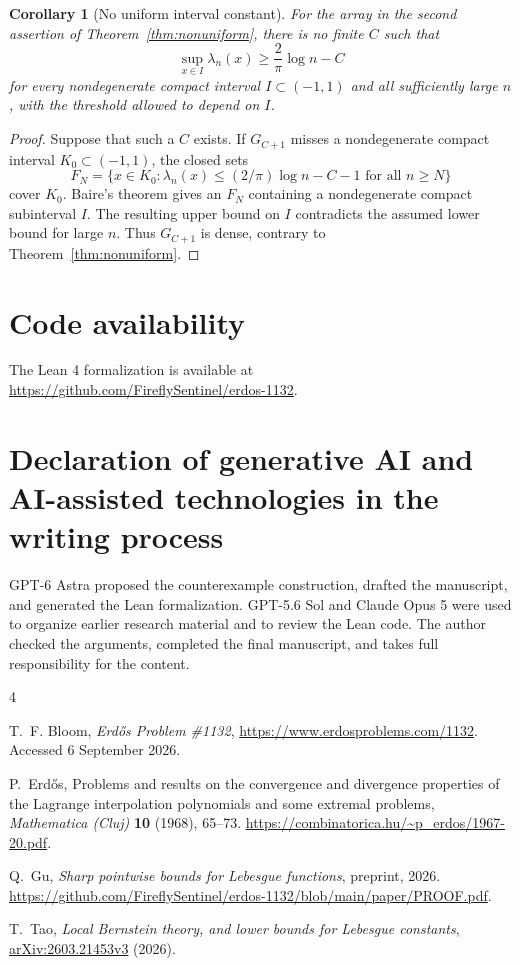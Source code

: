 \documentclass[11pt]{article}
\newtheorem{corollary}[theorem]{Corollary}
\theoremstyle{remark}
\numberwithin{equation}{section}
\begin{document}
\begin{corollary}[No uniform interval constant]\label{cor:no-uniform-interval}
For the array in the second assertion of Theorem~\ref{thm:nonuniform},
there is no finite \(C\) such that
\[
 \sup_{x\in I}\lambda_n(x)\ge\frac2\pi\log n-C
\]
for every nondegenerate compact interval \(I\subset(-1,1)\) and all sufficiently
large \(n\), with the threshold allowed to depend on \(I\).
\end{corollary}
\begin{proof}
Suppose that such a \(C\) exists. If \(G_{C+1}\) misses a nondegenerate
compact interval \(K_0\subset(-1,1)\), the closed sets
\[
 F_N=\{x\in K_0:\lambda_n(x)\le(2/\pi)\log n-C-1
                    \text{ for all }n\ge N\}
\]
cover \(K_0\). Baire's theorem gives an \(F_N\) containing a
nondegenerate compact subinterval \(I\). The resulting upper bound on \(I\)
contradicts the assumed lower bound for large \(n\).
Thus \(G_{C+1}\) is dense, contrary to Theorem~\ref{thm:nonuniform}.
\end{proof}

\section*{Code availability}

The Lean 4 formalization is available at
\url{https://github.com/FireflySentinel/erdos-1132}.

\section*{Declaration of generative AI and AI-assisted technologies in the writing process}

GPT-6 Astra proposed the counterexample construction, drafted the
manuscript, and generated the Lean formalization.
GPT-5.6 Sol and Claude Opus 5 were used to organize earlier research material
and to review the Lean code.
The author checked the arguments, completed the final manuscript, and takes
full responsibility for the content.

\begin{thebibliography}{4}

T.~F. Bloom,
\emph{Erd\H{o}s Problem \#1132},
\url{https://www.erdosproblems.com/1132}.
Accessed 6 September 2026.

P.~Erd\H{o}s,
Problems and results on the convergence and divergence properties of
the Lagrange interpolation polynomials and some extremal problems,
\emph{Mathematica (Cluj)} \textbf{10} (1968), 65--73.
\url{https://combinatorica.hu/~p_erdos/1967-20.pdf}.

Q.~Gu,
\emph{Sharp pointwise bounds for Lebesgue functions},
preprint, 2026.
\url{https://github.com/FireflySentinel/erdos-1132/blob/main/paper/PROOF.pdf}.

T.~Tao,
\emph{Local Bernstein theory, and lower bounds for Lebesgue constants},
\href{https://arxiv.org/abs/2603.21453v3}{arXiv:2603.21453v3}
(2026).

\end{thebibliography}
\end{document}

